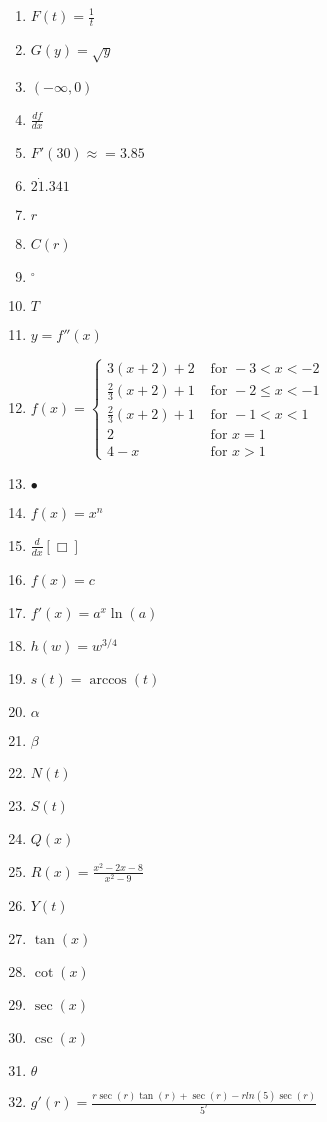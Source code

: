 \documentclass[oneside,10pt,]{article}
\newcommand{\lt}{<}
\newcommand{\gt}{>}
\newcommand{\amp}{&}
\begin{document}
\begin{enumerate}
\item{}\(\displaystyle F(t) = \frac{1}{t}\)%
\item{}\(\displaystyle G(y) = \sqrt{y}\)%
\item{}\((-\infty,0)\)%
\item{}\(\frac{df}{dx}\)%
\item{}\(F'(30) \approx = 3.85\)%
\item{}\(2 \dot 1.341\)%
\item{}\(r\)%
\item{}\(C(r)\)%
\item{}\(^{\circ}\)%
\item{}\(T\)%
\item{}\(y = f''(x)\)%
\item{}\(f(x) = \begin{cases}3(x+2)+2 \amp  \text{ for } -3 \lt  x \lt  -2  \\
\frac{2}{3}(x+2)+1 \amp  \text{ for } -2  \le x \lt  -1  \\
\frac{2}{3}(x+2)+1 \amp  \text{ for } -1  \lt x \lt   1  \\
2 \amp  \text{ for } x = 1  \\
4-x \amp  \text{ for } x \gt 1
\end{cases}\)%
\item{}\(\bullet\)%
\item{}\(f(x) = x^n\)%
\item{}\(\frac{d}{dx}\left[ \Box \right]\)%
\item{}\(f(x) = c\)%
\item{}\(f'(x) = a^x \ln(a)\)%
\item{}\(\displaystyle h(w) = w^{3/4}\)%
\item{}\(s(t) = \arccos(t)\)%
\item{}\(\alpha\)%
\item{}\(\beta\)%
\item{}\(N(t)\)%
\item{}\(S(t)\)%
\item{}\(Q(x)\)%
\item{}\(\displaystyle R(x) = \frac{x^2 - 2x - 8}{x^2 - 9}\)%
\item{}\(Y(t)\)%
\item{}\(\tan(x)\)%
\item{}\(\cot(x)\)%
\item{}\(\sec(x)\)%
\item{}\(\csc(x)\)%
\item{}\(\theta\)%
\item{}\(g'(r) = \frac{r \sec(r) \tan(r) + \sec(r) - r ln(5) \sec(r)}{5^r}\)%

\end{enumerate}
\end{document}
